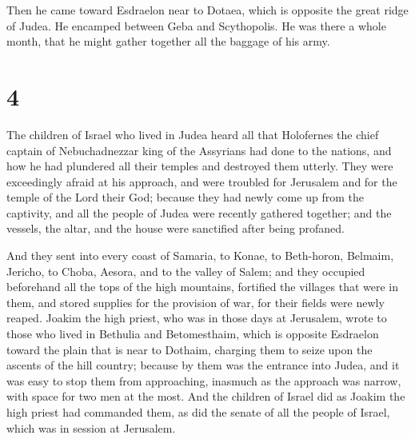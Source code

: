  Then he came toward Esdraelon near to Dotaea, which is
opposite the great ridge of Judea.  He encamped between
Geba and Scythopolis. He was there a whole month, that he might gather
together all the baggage of his army.

\hypertarget{section-3}{%
\section{4}\label{section-3}}

 The children of Israel who lived in Judea heard all that
Holofernes the chief captain of Nebuchadnezzar king of the Assyrians had
done to the nations, and how he had plundered all their temples and
destroyed them utterly.  They were exceedingly afraid at his
approach, and were troubled for Jerusalem and for the temple of the Lord
their God;  because they had newly come up from the
captivity, and all the people of Judea were recently gathered together;
and the vessels, the altar, and the house were sanctified after being
profaned.

 And they sent into every coast of Samaria, to Konae, to
Beth-horon, Belmaim, Jericho, to Choba, Aesora, and to the valley of
Salem;  and they occupied beforehand all the tops of the
high mountains, fortified the villages that were in them, and stored
supplies for the provision of war, for their fields were newly reaped.
 Joakim the high priest, who was in those days at Jerusalem,
wrote to those who lived in Bethulia and Betomesthaim, which is opposite
Esdraelon toward the plain that is near to Dothaim, 
charging them to seize upon the ascents of the hill country; because by
them was the entrance into Judea, and it was easy to stop them from
approaching, inasmuch as the approach was narrow, with space for two men
at the most.  And the children of Israel did as Joakim the
high priest had commanded them, as did the senate of all the people of
Israel, which was in session at Jerusalem.

